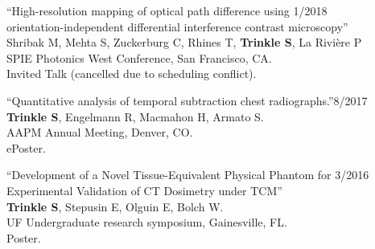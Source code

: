 \documentclass[10pt,letterpaper]{article}
\begin{document}
\begin{etaremune}[labelsep=0.035\textwidth]
\item{``High-resolution mapping of optical path difference using \hfill 1/2018\\
    orientation-independent differential interference contrast microscopy'' \\
    Shribak M, Mehta S, Zuckerburg C, Rhines T, \textbf{Trinkle S}, La Rivi\`ere P\\
    SPIE Photonics West Conference, San Francisco, CA. \\
    Invited Talk (cancelled due to scheduling conflict).}
  
\item{``Quantitative analysis of temporal subtraction chest radiographs.''\hfill 8/2017\\
    \textbf{Trinkle S}, Engelmann R, Macmahon H, Armato S. \\
    AAPM Annual Meeting, Denver, CO. \\
    ePoster.}

\item{``Development of a Novel Tissue-Equivalent Physical Phantom for \hfill 3/2016\\
    Experimental Validation of CT Dosimetry under TCM'' \\
    \textbf{Trinkle S}, Stepusin E, Olguin E, Bolch W.\\
    UF Undergraduate research symposium, Gainesville, FL. \\
    Poster.}

\end{etaremune}
\end{document}
